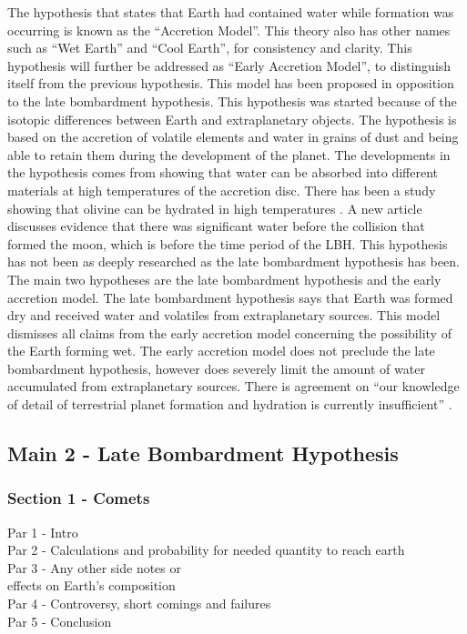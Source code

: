The hypothesis that states that Earth had contained water while formation was occurring is known as the “Accretion Model”. This theory also has other names such as “Wet Earth” and “Cool Earth”, for consistency and clarity. This hypothesis will further be addressed as “Early Accretion Model”, to distinguish itself from the previous hypothesis. This model has been proposed in opposition to the late bombardment hypothesis. This hypothesis was started because of the isotopic differences between Earth and extraplanetary objects. The hypothesis is based on the accretion of volatile elements and water in grains of dust and being able to retain them during the development of the planet. The developments in the hypothesis comes from showing that water can be absorbed into different materials at high temperatures of the accretion disc. There has been a study showing that olivine can be hydrated in high temperatures \cite{BOMB11} \cite{BOMB12}. A new article \cite{BOMB13} discusses evidence that there was significant water before the collision that formed the moon, which is before the time period of the LBH. This hypothesis has not been as deeply researched as the late bombardment hypothesis has been.\\

The main two hypotheses are the late bombardment hypothesis and the early accretion model. The late bombardment hypothesis says that Earth was formed dry and received water and volatiles from extraplanetary sources. This model dismisses all claims from the early accretion model concerning the possibility of the Earth forming wet. The early accretion model does not preclude the late bombardment hypothesis, however does severely limit the amount of water accumulated from extraplanetary sources. There is agreement on “our knowledge of detail of terrestrial planet formation and hydration is currently insufficient” \cite{BOMB14}. \\

\subsection{Main 2 - Late Bombardment Hypothesis}
\subsubsection{Section 1 - Comets}
Par 1 - Intro\\
Par 2 - Calculations and probability for needed quantity to reach earth\\
Par 3 - Any other side notes or\\ effects on Earth’s composition\\
Par 4 - Controversy, short comings and failures\\
Par 5 - Conclusion\\

